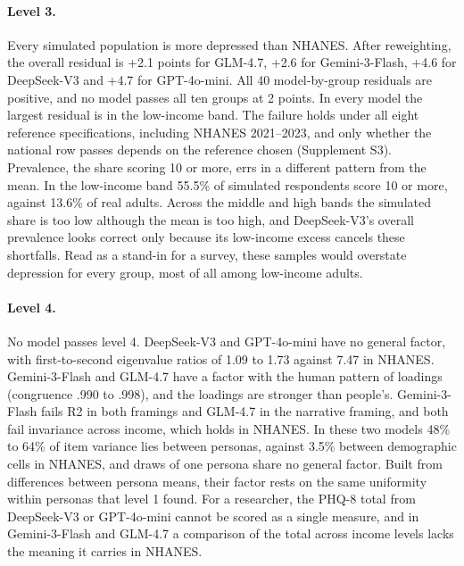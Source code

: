 \paragraph{Level 3.}
Every simulated population is more depressed than NHANES.
After reweighting, the overall residual is +2.1 points for GLM-4.7, +2.6 for Gemini-3-Flash, +4.6 for DeepSeek-V3 and +4.7 for GPT-4o-mini. %
All 40 model-by-group residuals are positive, and no model passes all ten groups at 2 points. %
In every model the largest residual is in the low-income band. %
The failure holds under all eight reference specifications, including NHANES 2021--2023, and only whether the national row passes depends on the reference chosen (Supplement S3). %
Prevalence, the share scoring 10 or more, errs in a different pattern from the mean.
In the low-income band 55.5\% of simulated respondents score 10 or more, against 13.6\% of real adults. %
Across the middle and high bands the simulated share is too low although the mean is too high, and DeepSeek-V3's overall prevalence looks correct only because its low-income excess cancels these shortfalls. %
Read as a stand-in for a survey, these samples would overstate depression for every group, most of all among low-income adults.

\paragraph{Level 4.}
No model passes level 4.
DeepSeek-V3 and GPT-4o-mini have no general factor, with first-to-second eigenvalue ratios of 1.09 to 1.73 against 7.47 in NHANES. %
Gemini-3-Flash and GLM-4.7 have a factor with the human pattern of loadings (congruence .990 to .998), and the loadings are stronger than people's. %
Gemini-3-Flash fails R2 in both framings and GLM-4.7 in the narrative framing, and both fail invariance across income, which holds in NHANES. %
In these two models 48\% to 64\% of item variance lies between personas, against 3.5\% between demographic cells in NHANES, and draws of one persona share no general factor. %
Built from differences between persona means, their factor rests on the same uniformity within personas that level 1 found.
For a researcher, the PHQ-8 total from DeepSeek-V3 or GPT-4o-mini cannot be scored as a single measure, and in Gemini-3-Flash and GLM-4.7 a comparison of the total across income levels lacks the meaning it carries in NHANES.

